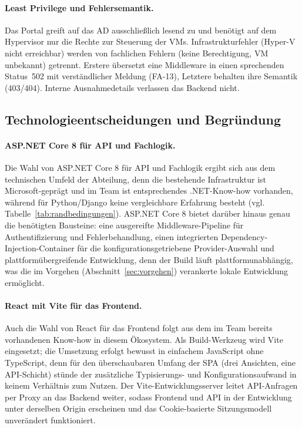 \documentclass[12pt,a4paper]{article}
\begin{document}
\paragraph{Least Privilege und Fehlersemantik.} Das Portal greift auf das AD ausschließlich lesend zu und benötigt auf dem Hypervisor nur die Rechte zur Steuerung der VMs. Infrastrukturfehler (Hyper-V nicht erreichbar) werden von fachlichen Fehlern (keine Berechtigung, VM unbekannt) getrennt. Erstere übersetzt eine Middleware in einen sprechenden Status~502 mit verständlicher Meldung (FA-13), Letztere behalten ihre Semantik (403/404). Interne Ausnahmedetails verlassen das Backend nicht.

\subsection{Technologieentscheidungen und Begründung}
\label{sec:technologieentscheidungen}

\paragraph{ASP.NET Core 8 für API und Fachlogik.} Die Wahl von ASP.NET Core 8 für API und Fachlogik ergibt sich aus dem technischen Umfeld der Abteilung, denn die bestehende Infrastruktur ist Microsoft-geprägt und im Team ist entsprechendes .NET-Know-how vorhanden, während für Python/Django keine vergleichbare Erfahrung besteht (vgl. Tabelle~\ref{tab:randbedingungen}). ASP.NET Core 8 bietet darüber hinaus genau die benötigten Bausteine: eine ausgereifte Middleware-Pipeline für Authentifizierung und Fehlerbehandlung, einen integrierten Dependency-Injection-Container für die konfigurationsgetriebene Provider-Auswahl und plattformübergreifende Entwicklung, denn der Build läuft plattformunabhängig, was die im Vorgehen (Abschnitt~\ref{sec:vorgehen}) verankerte lokale Entwicklung ermöglicht.

\paragraph{React mit Vite für das Frontend.} Auch die Wahl von React für das Frontend folgt aus dem im Team bereits vorhandenen Know-how in diesem Ökosystem. Als Build-Werkzeug wird Vite eingesetzt; die Umsetzung erfolgt bewusst in einfachem JavaScript ohne TypeScript, denn für den überschaubaren Umfang der SPA (drei Ansichten, eine API-Schicht) stünde der zusätzliche Typisierungs- und Konfigurationsaufwand in keinem Verhältnis zum Nutzen. Der Vite-Entwicklungsserver leitet API-Anfragen per Proxy an das Backend weiter, sodass Frontend und API in der Entwicklung unter derselben Origin erscheinen und das Cookie-basierte Sitzungsmodell unverändert funktioniert.
\end{document}
